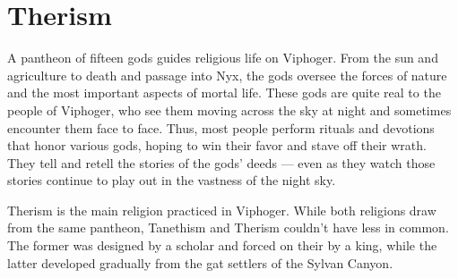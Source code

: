 
\vspace{14.0cm}

\section{Therism} \label{ssec::therism}

A pantheon of fifteen gods guides religious life on Viphoger.
From the sun and agriculture to death and passage into Nyx, the gods oversee the forces of nature and the most important aspects of mortal life.
These gods are quite real to the people of Viphoger, who see them moving across the sky at night and sometimes encounter them face to face.
Thus, most people perform rituals and devotions that honor various gods, hoping to win their favor and stave off their wrath.
They tell and retell the stories of the gods' deeds --- even as they watch those stories continue to play out in the vastness of the night sky.

Therism is the main religion practiced in Viphoger.
While both religions draw from the same pantheon, Tanethism and Therism couldn't have less in common.
The former was designed by a scholar and forced on their by a king, while the latter developed gradually from the gat settlers of the Sylvan Canyon.

